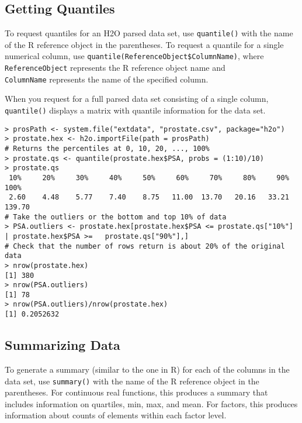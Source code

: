 {{\subsection{Getting Quantiles}

To request quantiles for an H2O parsed data set, use {\texttt{quantile()}} with the name of the R reference object in the parentheses.
To request a quantile for a single numerical column, use  {\texttt{quantile(ReferenceObject\$ColumnName)}},  where {\texttt{ReferenceObject}} represents the R reference object name and \\{\texttt{ColumnName}} represents the name of the specified column. 

When you request for a full parsed data set consisting of a single column, {\texttt{quantile()}} displays a matrix with quantile information for the data set. 
\smallskip

\begin{lstlisting}[style=R]
> prosPath <- system.file("extdata", "prostate.csv", package="h2o")
> prostate.hex <- h2o.importFile(path = prosPath)
# Returns the percentiles at 0, 10, 20, ..., 100%
> prostate.qs <- quantile(prostate.hex$PSA, probs = (1:10)/10)
> prostate.qs
 10%     20%     30%     40%     50%     60%     70%     80%     90%    100% 
 2.60    4.48    5.77    7.40    8.75   11.00  13.70   20.16   33.21  139.70 
# Take the outliers or the bottom and top 10% of data
> PSA.outliers <- prostate.hex[prostate.hex$PSA <= prostate.qs["10%"] | prostate.hex$PSA >=   prostate.qs["90%"],]
# Check that the number of rows return is about 20% of the original data
> nrow(prostate.hex)
[1] 380
> nrow(PSA.outliers)
[1] 78
> nrow(PSA.outliers)/nrow(prostate.hex)
[1] 0.2052632
\end{lstlisting}

\newpage
\subsection{Summarizing Data}


To generate a summary (similar to the one in R) for each of the columns in the data set, use {\texttt{summary()}} with the name of the R reference object in the parentheses.
For continuous real functions, this produces a summary that includes information on quartiles, min, max, and mean. 
For factors, this produces information about counts of elements within each factor level. 

}}
